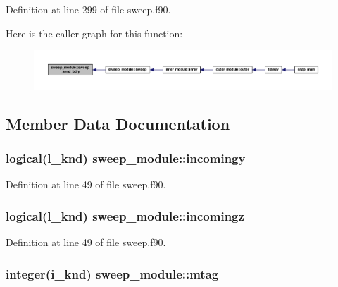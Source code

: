 Definition at line 299 of file sweep.\-f90.



Here is the caller graph for this function\-:\nopagebreak
\begin{figure}[H]
\begin{center}
\leavevmode
\includegraphics[width=350pt]{classsweep__module_a4eb92bcf3c9cd5265030a030fe7c7937_icgraph}
\end{center}
\end{figure}




\subsection{Member Data Documentation}
\hypertarget{classsweep__module_a2169c5c3d0b58d4481c11c192d77139d}{
\subsubsection[{incomingy}]{\setlength{\rightskip}{0pt plus 5cm}logical(l\-\_\-knd) sweep\-\_\-module\-::incomingy\hspace{0.3cm}{\ttfamily [private]}}}\label{classsweep__module_a2169c5c3d0b58d4481c11c192d77139d}


Definition at line 49 of file sweep.\-f90.

\hypertarget{classsweep__module_a0a5733d013646bed24b58e6e63c1f348}{
\subsubsection[{incomingz}]{\setlength{\rightskip}{0pt plus 5cm}logical(l\-\_\-knd) sweep\-\_\-module\-::incomingz\hspace{0.3cm}{\ttfamily [private]}}}\label{classsweep__module_a0a5733d013646bed24b58e6e63c1f348}


Definition at line 49 of file sweep.\-f90.

\hypertarget{classsweep__module_a39fa545755e54cbd311b4fe016cfa439}{
\subsubsection[{mtag}]{\setlength{\rightskip}{0pt plus 5cm}integer(i\-\_\-knd) sweep\-\_\-module\-::mtag\hspace{0.3cm}{\ttfamily [private]}}}\label{classsweep__module_a39fa545755e54cbd311b4fe016cfa439}


